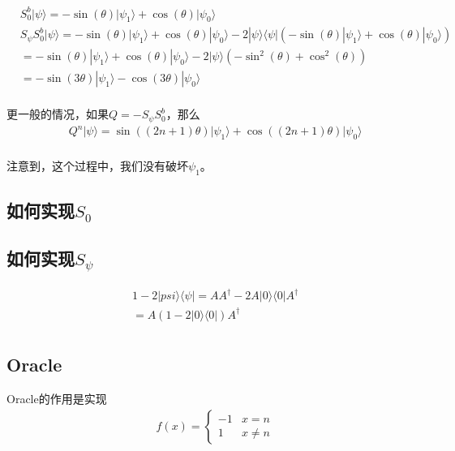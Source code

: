 \begin{equation}
\begin{split}
&S_0^b|\psi\rangle=-\sin(\theta)|\psi _1\rangle + \cos (\theta) |\psi _0\rangle\\
&S_{\psi}S_0^b|\psi\rangle=-\sin(\theta)|\psi _1\rangle + \cos (\theta) |\psi _0\rangle -2|\psi\rangle \langle \psi|\left(-\sin(\theta)|\psi _1\rangle + \cos (\theta) |\psi _0\rangle\right)\\
&=-\sin(\theta)|\psi _1\rangle + \cos (\theta) |\psi _0\rangle -2|\psi\rangle \left(-\sin^2(\theta) + \cos^2 (\theta) \right)\\
&=-\sin(3\theta)|\psi _1\rangle - \cos(3\theta) |\psi _0\rangle\\
\end{split}
\end{equation}

更一般的情况，如果$Q=-S_{\psi}S_0^b$，那么
\begin{equation}
\begin{split}
&Q^n |\psi\rangle = \sin((2n+1)\theta)|\psi _1\rangle + \cos((2n+1)\theta) |\psi _0\rangle\\
\end{split}
\end{equation}

注意到，这个过程中，我们没有破坏$\psi _1$。


\subsection{如何实现$S_0$}

\subsection{如何实现$S_{\psi}$}

\begin{equation}
\begin{split}
&1-2|psi\rangle \langle \psi | = AA^{\dagger} - 2 A|0\rangle \langle 0|A^{\dagger}\\
&=A(1-2|0\rangle \langle 0 |)A^{\dagger}\\
\end{split}
\end{equation}

\subsection{Oracle}

Oracle的作用是实现
\begin{equation}
\begin{split}
&f(x)=\left\{\begin{array}{cc}-1 & x=n\\ 1 & x\neq n \end{array}\right.
\end{split}
\end{equation}

